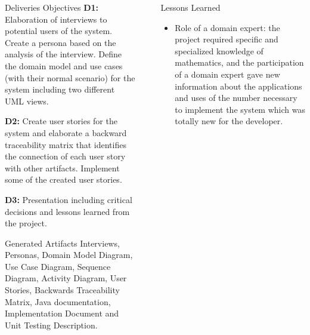 \documentclass[final]{beamer}
\newlength{\sepwid}
\newlength{\onecolwid}
\newlength{\twocolwid}
\begin{document}
\begin{frame}[t]
\begin{columns}[t]
\begin{column}{\onecolwid}
\begin{block}{Deliveries Objectives}
\textbf{D1:} Elaboration of interviews to potential users of the system. Create a persona based on the analysis of the interview. Define the domain model and use cases (with their normal scenario) for the system including two different UML views.

\textbf{D2:} Create user stories for the system and elaborate a backward traceability matrix that identifies the connection of each user story with other artifacts. Implement some of the created user stories.

\textbf{D3:} Presentation including critical decisions and lessons learned from the project.

\end{block}


\begin{alertblock}{Generated Artifacts}
Interviews, Personas, Domain Model Diagram, Use Case Diagram, Sequence Diagram, Activity Diagram, User Stories, Backwards Traceability Matrix, Java documentation, Implementation Document and Unit Testing Description.
\end{alertblock}

\end{column} %

\begin{column}{\sepwid}\end{column} %

\begin{column}{\onecolwid} %



\begin{block}{Lessons Learned}

\begin{itemize}

\item Role of a domain expert: the project required specific and specialized knowledge of mathematics, and the participation of a domain expert gave new information about the applications and uses of the number necessary to implement the system which was totally new for the developer.\newline


\end{itemize}
\end{block}
\end{column}
\end{columns}
\end{frame}
\end{document}
